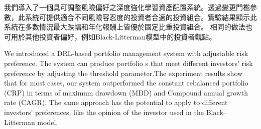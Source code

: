 \begin{abstractzh}
我們導入了一個具可調整風險偏好之深度強化學習資產配置系統。透過變更門檻參數，此系統可提供適合不同風險容忍度的投資者合適的投資組合。實驗結果顯示此系統在多數情況最大跌幅和年化報酬上皆優於固定比重投資組合。
相同的做法也可用於其他投資者偏好，例如Black-Litterman模型中的投資者觀點\cite{black1992global}。 

\end{abstractzh}

\begin{abstracten}
We introduced a DRL-based portfolio management system with adjustable risk preference. The system can produce portfolio s that meet different investors' risk preference by adjusting the threshold parameter.The experiment results show that for most cases, our system outperformed the constant rebalanced portfolio (CRP) in terms of maximum drawdown (MDD) and Compound annual growth rate (CAGR). The same approach has the potential to apply to different investors' preferences, like the opinion of the investor used in the Black–Litterman model\cite{black1992global}. 
\end{abstracten}



